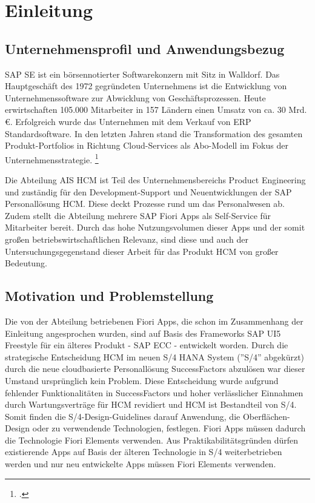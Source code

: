 \chapter{Einleitung}

\section{Unternehmensprofil und Anwendungsbezug}

SAP SE ist ein börsennotierter Softwarekonzern mit Sitz in Walldorf. Das Hauptgeschäft des 1972 gegründeten Unternehmens ist die Entwicklung von Unternehmenssoftware zur Abwicklung von Geschäftsprozessen. Heute erwirtschaften 105.000 Mitarbeiter in 157 Ländern einen Umsatz von ca. 30 Mrd. \euro{}. Erfolgreich wurde das Unternehmen mit dem Verkauf von ERP Standardsoftware. In den letzten Jahren stand die Transformation des gesamten Produkt-Portfolios in Richtung Cloud-Services als Abo-Modell im Fokus der Unternehmensstrategie. \footcite[Vgl.][]{sap_geschichte_2023}

Die Abteilung AIS HCM ist Teil des Unternehmensbereichs Product Engineering und zuständig für den Development-Support und Neuentwicklungen der SAP Personallösung HCM. Diese deckt Prozesse rund um das Personalwesen ab. Zudem stellt die Abteilung mehrere SAP Fiori Apps als Self-Service für Mitarbeiter bereit. Durch das hohe Nutzungsvolumen dieser Apps und der somit gro{\ss}en betriebswirtschaftlichen Relevanz, sind diese und auch der Untersuchungsgegenstand dieser Arbeit für das Produkt HCM von gro{\ss}er Bedeutung.


\section{Motivation und Problemstellung}

Die von der Abteilung betriebenen Fiori Apps, die schon im Zusammenhang der Einleitung angesprochen wurden, sind auf Basis des Frameworks SAP UI5 Freestyle für ein älteres Produkt - SAP ECC - entwickelt worden. Durch die strategische Entscheidung HCM im neuen S/4 HANA System (''S/4'' abgekürzt) durch die neue cloudbasierte Personallösung SuccessFactors abzulösen war dieser Umstand ursprünglich kein Problem. Diese Entscheidung wurde aufgrund fehlender Funktionalitäten in SuccessFactors und hoher verlässlicher Einnahmen durch Wartungsverträge für HCM revidiert und HCM ist Bestandteil von S/4. Somit finden die S/4-Design-Guidelines darauf Anwendung, die \zB Oberflächen-Design oder zu verwendende Technologien, festlegen. Fiori Apps müssen dadurch die Technologie Fiori Elements verwenden. Aus Praktikabilitätsgründen dürfen existierende Apps auf Basis der älteren Technologie in S/4 weiterbetrieben werden und nur neu entwickelte Apps müssen Fiori Elements verwenden.


